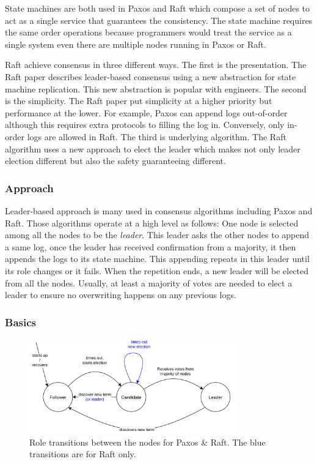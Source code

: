 \documentclass[12pt, a4paper]{article}
\begin{document}
State machines are both used in Paxos and Raft which compose a set of nodes to act as a single service that guarantees the consistency. The state machine requires the same order operations because programmers would treat the service as a single system even there are multiple nodes running in Paxos or Raft.

Raft achieve consensus in three different ways. The first is the presentation. The Raft paper describes leader-based consensus using a new abstraction for state machine replication. This new abstraction is popular with engineers. The second is the simplicity. The Raft paper put simplicity at a higher priority but performance at the lower. For example, Paxos can append logs out-of-order although this requires extra protocols to filling the log in. Conversely, only in-order logs are allowed in Raft. The third is underlying algorithm. The Raft algorithm uses a new approach to elect the leader which makes not only leader election different but also the safety guaranteeing different.

\subsubsection{Approach}
Leader-based approach is many used in consensus algorithms including Paxos and Raft. Those algorithms operate at a high level as follows: One node is selected among all the nodes to be the \textit{leader}. This leader asks the other nodes to append a same log, once the leader has received confirmation from a majority, it then appends the logs to its state machine. This appending repeats in this leader until its role changes or it fails. When the repetition ends, a new leader will be elected from all the nodes. Usually, at least a majority of votes are needed to elect a leader to ensure no overwriting happens on any previous logs.

\subsubsection{Basics}

\begin{figure}[htp]
\begin{center}
  \centering
  \includegraphics[width=0.8\textwidth]{img/roles-transitions.png}
  \caption{Role transitions between the nodes for Paxos \& Raft. The blue transitions are for Raft only.}
  \label{fig:roles-transitions}
\end{center}
\end{figure}
\end{document}
